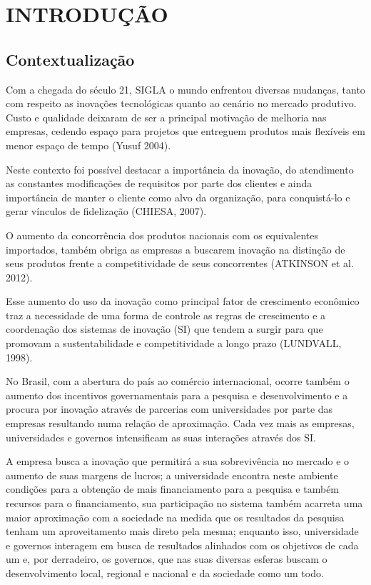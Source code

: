 \chapter{INTRODUÇÃO}
\thispagestyle{empty}

\section{Contextualização}
Com a chegada do século 21, SIGLA o mundo enfrentou diversas mudanças, tanto com respeito as inovações tecnológicas quanto ao cenário no mercado produtivo. Custo e qualidade deixaram de ser a principal motivação de melhoria nas empresas, cedendo espaço para projetos que entreguem produtos mais flexíveis em menor espaço de tempo (Yusuf 2004).

Neste contexto foi possível destacar a importância da inovação, do atendimento as constantes modificações de requisitos por parte dos clientes e ainda importância de manter o cliente como alvo da organização, para conquistá-lo e gerar vínculos de fidelização (CHIESA, 2007).

O aumento da concorrência dos produtos nacionais com os equivalentes importados, também obriga as empresas a buscarem inovação na distinção de seus produtos frente a competitividade de seus concorrentes (ATKINSON et al. 2012).

Esse aumento do uso da inovação como principal fator de crescimento econômico traz a necessidade de uma forma de controle as regras de crescimento e a coordenação dos sistemas de inovação (SI) que tendem a surgir para que promovam a sustentabilidade e competitividade a longo prazo (LUNDVALL, 1998).

No Brasil, com a abertura do país ao comércio internacional, ocorre também o aumento dos incentivos governamentais para a pesquisa e desenvolvimento e a procura por inovação através de parcerias com universidades por parte das empresas resultando numa relação de aproximação. Cada vez mais as empresas, universidades e governos intensificam as suas interações através dos SI.

A empresa busca a inovação que permitirá a sua sobrevivência no mercado e o aumento de suas margens de lucros; a universidade encontra neste ambiente condições para a obtenção de mais financiamento para a pesquisa e também recursos para o financiamento, sua participação no sistema também acarreta uma maior aproximação com a sociedade na medida que os resultados da pesquisa tenham um aproveitamento mais direto pela mesma; enquanto isso, universidade e governos interagem em busca de resultados alinhados com os objetivos de cada um e, por derradeiro, os governos, que nas suas diversas esferas buscam o desenvolvimento local, regional e nacional e da sociedade como um todo.

